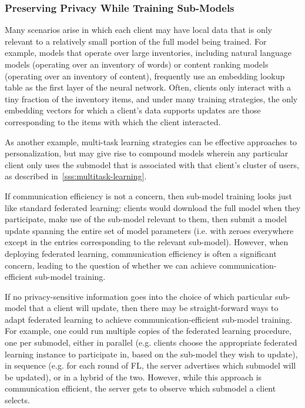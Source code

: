 \documentclass[11pt]{article}
\begin{document}
\subsubsection{Preserving Privacy While Training Sub-Models}
\label{sssec:training_submodels}

Many scenarios arise in which each client may have local data that is only relevant to a relatively small portion of the full model being trained.  For example, models that operate over large inventories, including natural language models (operating over an inventory of words) or content ranking models (operating over an inventory of content), frequently use an embedding lookup table as the first layer of the neural network.  Often, clients only interact with a tiny fraction of the inventory items, and under many training strategies, the only embedding vectors for which a client's data supports updates are those corresponding to the items with which the client interacted.

As another example, multi-task learning strategies can be effective approaches to personalization, but may give rise to compound models wherein any particular client only uses the submodel that is associated with that client's cluster of users, as described in~\cref{sss:multitask-learning}.

If communication efficiency is not a concern, then sub-model training looks just like standard federated learning: clients would download the full model when they participate, make use of the sub-model relevant to them, then submit a model update spanning the entire set of model parameters (i.e. with zeroes everywhere except in the entries corresponding to the relevant sub-model).  However, when deploying federated learning, communication efficiency is often a significant concern, leading to the question of whether we can achieve communication-efficient sub-model training.

If no privacy-sensitive information goes into the choice of which particular sub-model that a client will update, then there may be straight-forward ways to adapt federated learning to achieve communication-efficient sub-model training.  For example, one could run multiple copies of the federated learning procedure, one per submodel, either in parallel (e.g. clients choose the appropriate federated learning instance to participate in, based on the sub-model they wish to update), in sequence (e.g. for each round of FL, the server advertises which submodel will be updated), or in a hybrid of the two.  However, while this approach is communication efficient, the server gets to observe which submodel a client selects.
\end{document}
